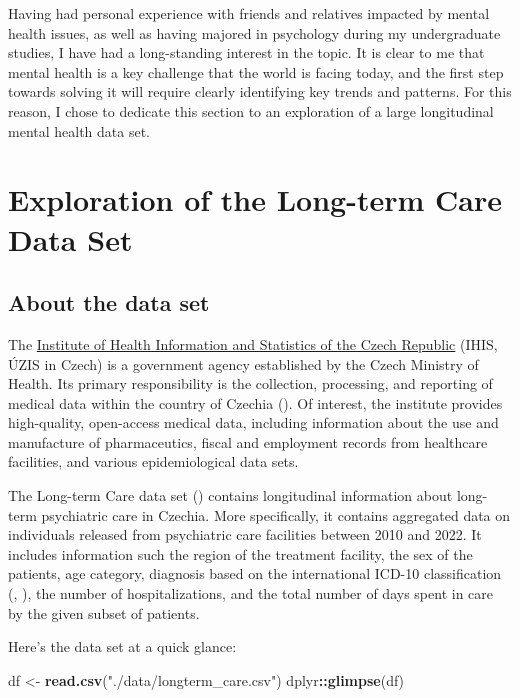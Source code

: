 \documentclass[
  openany]{book}
\newenvironment{Shaded}{\begin{snugshade}}{\end{snugshade}}
\newcommand{\FunctionTok}[1]{\textcolor[rgb]{0.13,0.29,0.53}{\textbf{#1}}}
\newcommand{\NormalTok}[1]{#1}
\newcommand{\OtherTok}[1]{\textcolor[rgb]{0.56,0.35,0.01}{#1}}
\newcommand{\SpecialCharTok}[1]{\textcolor[rgb]{0.81,0.36,0.00}{\textbf{#1}}}
\newcommand{\StringTok}[1]{\textcolor[rgb]{0.31,0.60,0.02}{#1}}
\theoremstyle{definition}
\theoremstyle{definition}
\theoremstyle{definition}
\theoremstyle{definition}
\theoremstyle{remark}
\begin{document}
Having had personal experience with friends and relatives impacted by mental health issues, as well as having majored in psychology during my undergraduate studies, I have had a long-standing interest in the topic. It is clear to me that mental health is a key challenge that the world is facing today, and the first step towards solving it will require clearly identifying key trends and patterns. For this reason, I chose to dedicate this section to an exploration of a large longitudinal mental health data set.

\section{Exploration of the Long-term Care Data Set}\label{exploration-of-the-long-term-care-data-set}

\subsection{About the data set}\label{about-the-data-set}

The \href{https://www.uzis.cz/index-en.php}{Institute of Health Information and Statistics of the Czech Republic} (IHIS, ÚZIS in Czech) is a government agency established by the Czech Ministry of Health. Its primary responsibility is the collection, processing, and reporting of medical data within the country of Czechia (). Of interest, the institute provides high-quality, open-access medical data, including information about the use and manufacture of pharmaceutics, fiscal and employment records from healthcare facilities, and various epidemiological data sets.

The Long-term Care data set () contains longitudinal information about long-term psychiatric care in Czechia. More specifically, it contains aggregated data on individuals released from psychiatric care facilities between 2010 and 2022. It includes information such the region of the treatment facility, the sex of the patients, age category, diagnosis based on the international ICD-10 classification (, ), the number of hospitalizations, and the total number of days spent in care by the given subset of patients.

Here's the data set at a quick glance:

\begin{Shaded}
\begin{Highlighting}[]
\NormalTok{df }\OtherTok{\textless{}{-}} \FunctionTok{read.csv}\NormalTok{(}\StringTok{"./data/longterm\_care.csv"}\NormalTok{)}
\NormalTok{dplyr}\SpecialCharTok{::}\FunctionTok{glimpse}\NormalTok{(df)}
\end{Highlighting}
\end{Shaded}
\end{document}
